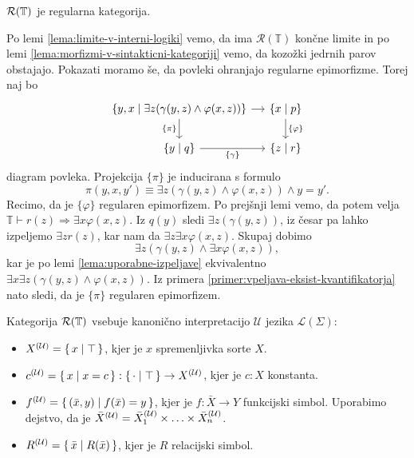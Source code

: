 \documentclass[../kategoricna_logika.tex]{subfiles}
\begin{document}
\begin{trditev}
  $\mathcal{R}(\T)$ je regularna kategorija.
\end{trditev}
\begin{dokaz}
  Po lemi \ref{lema:limite-v-interni-logiki} vemo, da ima
  $\mathcal{R}(\mathbb{T})$ končne limite in po lemi
  \ref{lema:morfizmi-v-sintakticni-kategoriji} vemo, da kozožki
  jedrnih parov obstajajo. Pokazati moramo še, da povleki ohranjajo
  regularne epimorfizme.  Torej naj bo
  \begin{equation*}
    \begin{tikzcd}[column sep=small]
      \{y,x \mid \exists z(\gamma(y,z) \land \varphi(x,z))\} \ar[d,
      "\{\pi\}"'] \ar[r] &
      \{ x \mid p\} \ar[d, "\{\varphi\}"] \\
      \{y \mid q\} \ar[r, "\{\gamma\}"'] & \{z \mid r\}
    \end{tikzcd}
  \end{equation*}
  diagram povleka. Projekcija $\{\pi\}$ je inducirana s formulo
  \[ \pi(y,x,y') \equiv \exists z(\gamma(y,z) \land \varphi(x,z))
    \land y=y'.\] Recimo, da je $\{\varphi\}$ regularen
  epimorfizem. Po prejšnji lemi vemo, da potem velja
  $\mathbb{T} \vdash r(z) \Rightarrow \exists x \varphi(x,z)$.  Iz
  $q(y)$ sledi $\exists z(\gamma(y,z))$, iz česar pa lahko izpeljemo
  $\exists z r(z)$, kar nam da $\exists z \exists x
  \varphi(x,z)$. Skupaj dobimo
  \[ \exists z(\gamma(y,z) \land \exists x \varphi(x,z)),\] kar je po
  lemi \ref{lema:uporabne-izpeljave} ekvivalentno
  $\exists x \exists z(\gamma(y,z) \land \varphi(x,z))$.  Iz primera
  \ref{primer:vpeljava-eksist-kvantifikatorja} nato sledi, da je
  $\{\pi\}$ regularen epimorfizem.
\end{dokaz}
\begin{definicija}
  Kategorija $\mathcal{R}(\T)$ vsebuje kanonično interpretacijo
  $\mathcal{U}$ jezika $\mathcal{L}(\Sigma)$:
  \begin{itemize}
  \item $\interp[\mathcal{U}]{X} = \set{x \mid  \top}$, kjer je
    $x$ spremenljivka sorte $X$.
  \item
    $\interp[\mathcal{U}]{c} = \set{x \mid  x = c} :
    \set{\cdot \mid  \top} \to \interp[\mathcal{U}]{X}$, kjer je
    $c:X$ konstanta.
  \item
    $\interp[\mathcal{U}]{f} = \set{(\bar{x},y) \mid  f(\bar{x})
      = y}$, kjer je $f : \bar{X}\to Y$ funkcijski simbol. Uporabimo
    dejstvo, da je
    $\bar{X}^{(\mathcal{U})} = \interp[\mathcal{U}]{\bar{X}_1} \times
    \ldots \times \interp[\mathcal{U}]{\bar{X}_n}$.
  \item
    $\interp[\mathcal{U}]{R} = \set{\bar{x} \mid  R(\bar{x})}$,
    kjer je $R$ relacijski simbol.
  \end{itemize}
\end{definicija}
\end{document}
